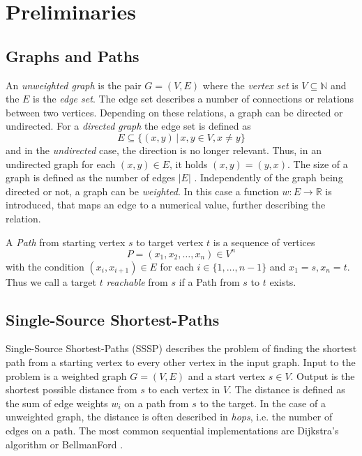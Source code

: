 
\section{Preliminaries}

\subsection{Graphs and Paths}
An \emph{unweighted graph} is the pair $G=(V,E)$ where the \emph{vertex set} is $V\subseteq\mathbb N$ and the $E$ is the \emph{edge set}.
The edge set describes a number of connections or relations between two vertices. Depending on these relations, a graph can be directed or undirected. For a \emph{directed graph} the edge set is defined as
\begin{equation*}
  E\subseteq\{(x,y)\,|\, x,y\in V, x\neq y\}
\end{equation*}
and in the \emph{undirected} case, the direction is no longer relevant. Thus, in an undirected graph for each $(x,y)\in E$, it holds $(x,y)=(y,x)$.
The size of a graph is defined as the number of edges $|E|$ \cite{newman2010networks}.
Independently of the graph being directed or not, a graph can be \emph{weighted}. In this case a function $w:E\rightarrow \mathbb R$ is introduced, that maps an edge to a numerical value, further describing the relation.

A \emph{Path} from starting vertex $s$ to target vertex $t$ is a sequence of vertices
\begin{equation*}
	P=(x_1,x_2,\ldots,x_n)\in V^n
\end{equation*}
with the condition $(x_i,x_{i+1})\in E$ for each $i\in\{1,\ldots,n-1\}$ and $x_1=s, x_n=t$.
Thus we call a target $t$ \emph{reachable} from $s$ if a Path from $s$ to $t$ exists.

\subsection{Single-Source Shortest-Paths}
Single-Source Shortest-Paths (SSSP) describes the problem of finding the shortest path from a starting vertex to every other vertex in the input graph.
Input to the problem is a weighted graph $G=(V,E)$ and a start vertex $s\in V$. Output is the shortest possible distance from $s$ to each vertex in $V$.
The distance is defined as the sum of edge weights $w_i$ on a path from $s$ to the target.
In the case of a unweighted graph, the distance is often described in \emph{hops}, i.e. the number of edges on a path.
The most common sequential implementations are Dijkstra's algorithm or BellmanFord \cite{Polymer, Ligra, pregel}.

